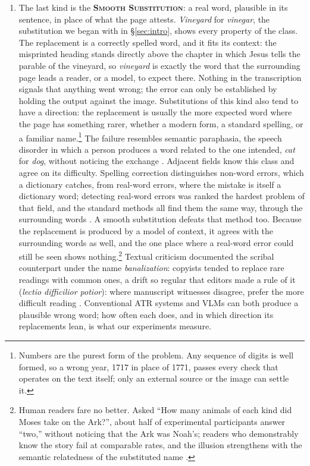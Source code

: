 \documentclass{anthology-ch}         %
\begin{document}
\begin{enumerate}
    \item The last kind is the \textsc{\textbf{Smooth Substitution}}: a real word, plausible in its sentence, in place of what the page attests. \emph{Vineyard} for \emph{vinegar}, the substitution we began with in \S\ref{sec:intro}, shows every property of the class. The replacement is a correctly spelled word, and it fits its context: the misprinted heading stands directly above the chapter in which Jesus tells the parable of the vineyard, so \emph{vineyard} is exactly the word that the surrounding page leads a reader, or a model, to expect there. Nothing in the transcription signals that anything went wrong; the error can only be established by holding the output against the image. Substitutions of this kind also tend to have a direction: the replacement is usually the more expected word where the page has something rarer, whether a modern form, a standard spelling, or a familiar name.\footnote{Numbers are the purest form of the problem. Any sequence of digits is well formed, so a wrong year, 1717 in place of 1771, passes every check that operates on the text itself; only an external source or the image can settle it.} The failure resembles semantic paraphasia, the speech disorder in which a person produces a word related to the one intended, \emph{cat} for \emph{dog}, without noticing the exchange \cite{goodglass_understanding_1993}. Adjacent fields know this class and agree on its difficulty. Spelling correction distinguishes non-word errors, which a dictionary catches, from real-word errors, where the mistake is itself a dictionary word; detecting real-word errors was ranked the hardest problem of that field, and the standard methods all find them the same way, through the surrounding words \cite{kukich_techniques_1992, mays_context_1991, golding_winnow-based_1999}. A smooth substitution defeats that method too. Because the replacement is produced by a model of context, it agrees with the surrounding words as well, and the one place where a real-word error could still be seen shows nothing.\footnote{Human readers fare no better. Asked ``How many animals of each kind did Moses take on the Ark?'', about half of experimental participants answer ``two,'' without noticing that the Ark was Noah's; readers who demonstrably know the story fail at comparable rates, and the illusion strengthens with the semantic relatedness of the substituted name \cite{erickson_words_1981, van_oostendorp_moses_1990}.} Textual criticism documented the scribal counterpart under the name \textit{banalization}: copyists tended to replace rare readings with common ones, a drift so regular that editors made a rule of it (\textit{lectio difficilior potior}): where manuscript witnesses disagree, prefer the more difficult reading \cite{timpanaro_freudian_1976}. Conventional ATR systems and VLMs can both produce a plausible wrong word; how often each does, and in which direction its replacements lean, is what our experiments measure.

\end{enumerate}
\end{document}

